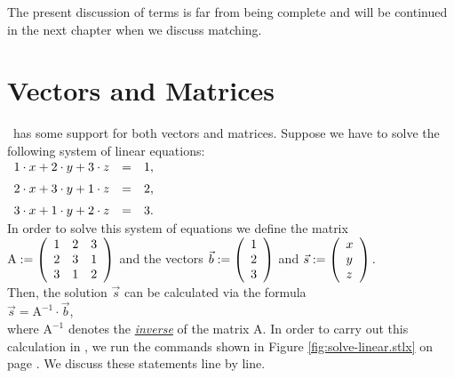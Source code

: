 The present discussion of terms is far from being complete and will be continued in the next chapter when we
discuss matching.

\section{Vectors and Matrices}
\setlx\ has some support for both vectors and matrices.  Suppose we have to solve the following system
of linear equations:
\\[0.2cm]
\hspace*{1.3cm}
$\begin{array}[c]{lcl}
    1 \cdot x + 2 \cdot y + 3 \cdot z & = & 1, \\[0.2cm]
    2 \cdot x + 3 \cdot y + 1 \cdot z & = & 2, \\[0.2cm]
    3 \cdot x + 1 \cdot y + 2 \cdot z & = & 3.          
  \end{array}
$
\\[0.2cm]
In order to solve this system of equations we define the matrix
\\[0.2cm]
\hspace*{1.3cm}
$\mathrm{A} := \left(
  \begin{array}[c]{lll}
    1 & 2 & 3     \\
    2 & 3 & 1     \\
    3 & 1 & 2            
  \end{array}\right)
$ \qquad and the vectors \qquad
$\vec{b} := \left(
  \begin{array}[c]{l}
    1 \\
    2 \\
    3        
  \end{array}\right)
$
\quad and \quad
$\vec{s} := \left(
  \begin{array}[c]{l}
    x \\
    y \\
    z        
  \end{array}\right).
$ 
\\[0.2cm]
Then, the solution $\vec{s}$ can be calculated via the formula
\\[0.2cm]
\hspace*{1.3cm}
$\vec{s} = \mathrm{A}^{-1} \cdot \vec{b}$,
\\[0.2cm]
where $\mathrm{A}^{-1}$ denotes the \href{http://en.wikipedia.org/wiki/Invertible_matrix}{\emph{inverse}} of
the matrix $\mathrm{A}$.  In order to carry out this calculation in 
\setlx, we run the commands shown in Figure \ref{fig:solve-linear.stlx} on page
\pageref{fig:solve-linear.stlx}.  We discuss these statements line by line.

